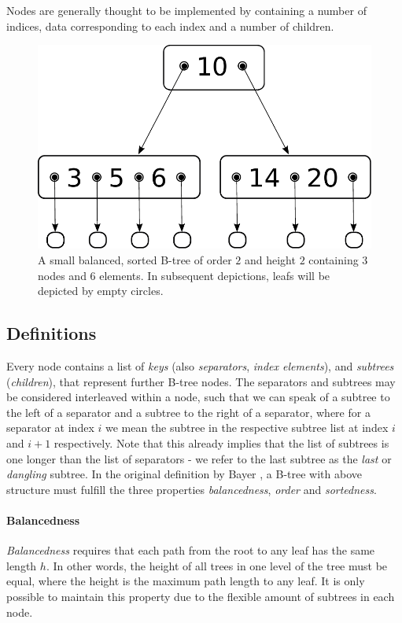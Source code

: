 Nodes are generally thought to be implemented by
containing a number of indices, data corresponding to each index
and a number of children.

\begin{figure}
    \centering
    \includegraphics[width=0.5\linewidth]{figures/btree-basic-nopair.pdf}
    \caption[A small example B-Tree]{A small balanced, sorted B-tree of order $2$ and
    height $2$ containing $3$ nodes and $6$ elements.
    In subsequent depictions, leafs will be depicted
    by empty circles.}
    \label{fig:btree-basic-nopair}
\end{figure}


\subsection{Definitions}
\label{sec:data_structure_defs}

Every node contains a list of \textit{keys} (also \textit{separators}, \textit{index elements}), and \textit{subtrees} (\textit{children}),
that represent further B-tree nodes.
The separators and subtrees may be considered interleaved within a node,
such that we can speak of a subtree to the left of a separator and
a subtree to the right of a separator,
where for a separator at index $i$ we mean the subtree in the respective
subtree list at index $i$ and $i+1$ respectively.
Note that this already implies that the list of subtrees is one
longer than the list of separators - we refer to the last subtree
as the \textit{last} or \textit{dangling} subtree.
In the original definition by Bayer \parencite{DBLP:journals/acta/BayerM72},
a B-tree with above structure must fulfill the three properties
\textit{balancedness}, \textit{order} and \textit{sortedness}.

\paragraph{Balancedness} \textit{Balancedness} requires
that each path from the root to any leaf has the same length $h$.
In other words, the height of all trees in one level of the tree must be equal,
where the height is the maximum path length to any leaf.
It is only possible to maintain this property
due to the flexible amount of subtrees in each node.

